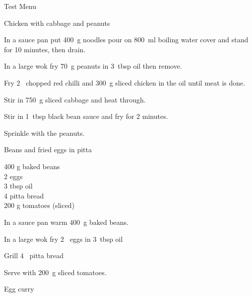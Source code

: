 \begin{menu}{Test Menu}
\begin{recipe}{2}{Chicken with cabbage and peanuts}
    \begin{instructions}
    \item 
      In a sauce pan
      put
      400~g  noodles
      pour on
      800~ml  boiling water
      cover and stand for 10 minutes, then drain.
    \item 
        In a large wok	fry
        70~g  peanuts
        in
        3~tbsp  oil
        then remove.
      \item 
        Fry 2~ chopped red chilli
        and
        300~g sliced chicken
        in the oil until meat is done.
      \item 
        Stir in
        750~g sliced cabbage
        and heat through.
      \item 
        Stir in
        1~tbsp  black bean sauce
        and fry for 2 minutes.
      \item 
        Sprinkle with the peanuts.
      
    \end{instructions}
    \end{recipe}%
  
    \begin{recipe}{1}{Beans and fried eggs in pitta}%
    
		\begin{ingredients}
		400 g baked beans  \\
	2  eggs  \\
	3 tbsp oil  \\
	4  pitta bread  \\
	200 g tomatoes (sliced) \\
	
		\end{ingredients}
	
    \begin{instructions}
    \item 
        In a sauce pan warm
        400~g  baked beans.
      \item 
        In a large wok fry
        2~  eggs
        in
        3~tbsp  oil\item 
        Grill
        4~  pitta bread\item 
        Serve with 200~g sliced tomatoes.
      
    \end{instructions}
    \end{recipe}%
  
    \begin{recipe}{2}{Egg curry}%
    

\end{recipe}
\end{menu}
